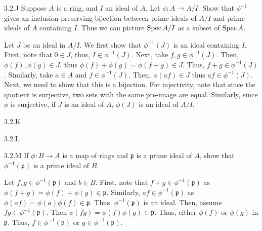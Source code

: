\begin{exercise}{3.2.J}
Suppose $A$ is a ring, and $I$ an ideal of $A$. Let $\phi \colon A \to A/I$.
Show that $\phi^{-1}$ gives an inclusion-preserving bijection between prime
ideals of $A/I$ and prime ideals of $A$ containing $I$. Thus we can picture
$\operatorname{Spec} A/I$ as a subset of $\operatorname{Spec} A$.
\end{exercise}
\begin{solution}
    Let $J$ be an ideal in $A/I$. We first show that $\phi^{-1}(J)$ is an ideal containing $I$. \bbni
    First, note that $0 \in J$, thus, $I \in \phi^{-1}(J)$. Next, take $f, g \in \phi^{-1}(J)$. Then, $\phi(f), \phi(g) \in J$, thus $\phi(f)+\phi(g) = \phi(f+g) \in J$. Thus, $f+g \in \phi^{-1}(J)$. Similarly, take $a \in A$ and $f \in \phi^{-1}(J)$. Then, $\phi(af) \in J$ thus $af \in \phi^{-1}(J)$. \bbni
    Next, we need to show that this is a bijection. For injectivity, note that since the quotient is surjective, two sets with the same pre-image are equal. Similarly, since $\phi$ is surjective, if $J$ is an ideal of $A$, $\phi(J)$ is an ideal of $A/I$. \todo{}
\end{solution}

\begin{exercise}{3.2.K}

\end{exercise}
\begin{solution}
    \todo{}
\end{solution}

\begin{exercise}{3.2.L}
\end{exercise}
\begin{solution}
    \todo{}
\end{solution}

\begin{exercise}{3.2.M}
    If $\phi: B \to A$ is a map of rings and $\mathfrak p$ is a prime ideal of $A$, show that $\phi^{-1}(\mathfrak p)$ is a prime ideal of $B$. 
\end{exercise}
\begin{solution}
    Let $f, g \in \phi^{-1}(\mathfrak p)$ and $b \in B$. First, note that $f + g \in \phi^{-1}(\mathfrak p)$ as $\phi(f+g) = \phi(f)+\phi(g) \in \mathfrak p$. Similarly, $af \in \phi^{-1}(\mathfrak p)$ as $\phi(af) = \phi(a)\phi(f) \in \mathfrak p$. Thus, $\phi^{-1}(\mathfrak p)$ is an ideal. Then, assume $fg \in \phi^{-1}(\mathfrak p)$. Then $\phi(fg) = \phi(f)\phi(g) \in \mathfrak p$. Thus, either $\phi(f)$ or $\phi(g)$ in $\mathfrak p$. Thus, $f \in \phi^{-1}(\mathfrak p)$ or $g \in \phi^{-1}(\mathfrak p)$. 
\end{solution}

